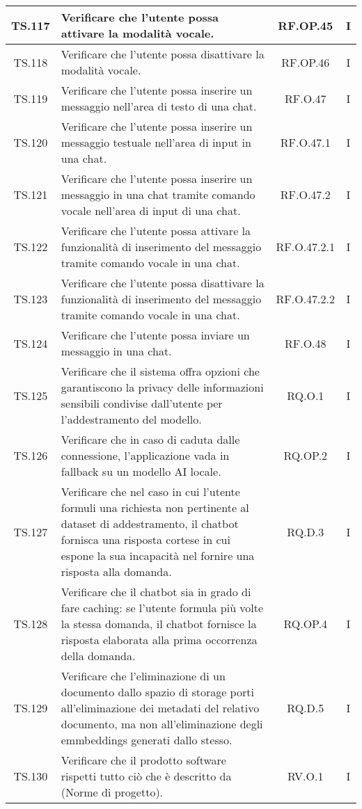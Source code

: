 {{{{{{{{{{\begin{xltabular}{\textwidth}{|c|X|c|c|}
\hline
TS.117 & Verificare che l'utente possa attivare la modalità vocale. & RF.OP.45 & I \\
\hline
TS.118 & Verificare che l'utente possa disattivare la modalità vocale. & RF.OP.46 & I \\
\hline
TS.119 & Verificare che l'utente possa inserire un messaggio nell’area di testo di una chat. & RF.O.47 & I \\
\hline
TS.120 & Verificare che l'utente possa inserire un messaggio testuale nell’area di input in una chat. & RF.O.47.1 & I \\
\hline
TS.121 & Verificare che l'utente possa inserire un messaggio in una chat tramite comando vocale nell’area di input di una chat. & RF.O.47.2 & I \\
\hline
TS.122 & Verificare che l'utente possa attivare la funzionalità di inserimento del messaggio tramite comando vocale in una chat. & RF.O.47.2.1 & I \\
\hline
TS.123 & Verificare che l'utente possa disattivare la funzionalità di inserimento del messaggio tramite comando vocale in una chat. & RF.O.47.2.2 & I \\
\hline
TS.124 & Verificare che l'utente possa inviare un messaggio in una chat. & RF.O.48 & I \\
\hline
TS.125 & Verificare che il sistema offra opzioni che garantiscono la privacy delle informazioni sensibili condivise dall’utente per l’addestramento del modello. & RQ.O.1 & I \\
\hline
TS.126 & Verificare che in caso di caduta dalle connessione, l’applicazione vada in fallback su un modello AI locale. & RQ.OP.2 & I \\
\hline
TS.127 & Verificare che nel caso in cui l’utente formuli una richiesta non pertinente al dataset di addestramento, il chatbot fornisca una risposta cortese in cui espone la sua incapacità nel fornire una risposta alla domanda. & RQ.D.3 & I \\
\hline
TS.128 & Verificare che il chatbot sia in grado di fare caching: se l’utente formula più volte la stessa domanda, il chatbot fornisce la risposta elaborata alla prima occorrenza della domanda. & RQ.OP.4 & I \\
\hline
TS.129 & Verificare che l’eliminazione di un documento dallo spazio di storage porti all’eliminazione dei metadati del relativo documento, ma non all’eliminazione degli emmbeddings generati dallo stesso. & RQ.D.5 & I \\
\hline
TS.130 & Verificare che il prodotto software rispetti tutto ciò che è descritto da (Norme di progetto). & RV.O.1 & I \\

\end{xltabular}}}}}}}}}}}
